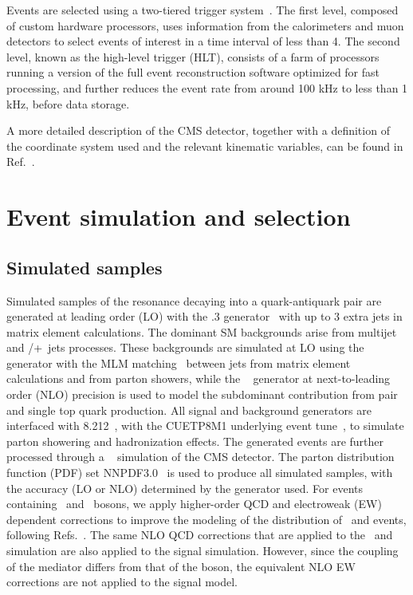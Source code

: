 \documentclass[11pt,twoside,a4paper,cmspaper,final,collab]{cms-tdr}
\begin{document}
Events are selected using a two-tiered trigger system~\cite{Khachatryan:2016bia}. 
The first level, composed
of custom hardware processors, uses information from the calorimeters and muon detectors
to select events of interest in a time interval of less than 4\mus. The
second level, known as the high-level trigger (HLT), consists of a farm of processors running a
version of the full event reconstruction software optimized for fast processing, and further reduces the
event rate from around 100 kHz to less than 1 kHz, before data storage.

A more detailed description of the CMS
detector, together with a definition of the coordinate system used and
the relevant kinematic variables, can be found
in Ref.~\cite{Chatrchyan:2008zzk}.
\label{sec:detector}

\section{Event simulation and selection}

\subsection{Simulated samples}

Simulated samples of the \PZpr resonance decaying into
a quark-antiquark pair are generated at leading order (LO) with the
.3 generator~\cite{Alwall:2014hca} with up to 3 extra jets in
matrix element calculations.  The
dominant SM backgrounds arise from multijet and \PW/\PZ+~jets processes.
These backgrounds are simulated at LO using the \MGvATNLO generator with the MLM
matching~\cite{Alwall:2007fs} between jets from matrix element calculations 
and from parton showers, while the ~\cite{POWHEG} generator 
at next-to-leading order (NLO) precision is used to
model the subdominant contribution from pair and single top quark production.  All signal and
background generators are interfaced with \PYTHIA{}
8.212~\cite{Sjostrand:2014zea}, with the CUETP8M1 underlying event tune~\cite{Khachatryan:2015pea}, to simulate 
parton showering and hadronization effects.  The generated
events are further processed through a \GEANTfour~\cite{Agostinelli:2002hh} simulation of the CMS detector.
The parton distribution function (PDF) set {NNPDF3.0}~\cite{Ball:2014uwa} is used to produce all simulated samples, 
with the accuracy (LO or NLO) determined by the generator used.
For events containing \PW~and \PZ~bosons, we apply higher-order QCD
and electroweak (EW) \pt dependent corrections to improve
the modeling of the \pt distribution of \PW~and \PZ events,
following Refs.~\cite{Sirunyan:2017hci,Kallweit:2014xda,Kallweit:2015dum,Kallweit:2015fta,Lindert:2017olm}.
The same NLO QCD corrections that are applied
to the \PW~and \PZ simulation are also applied to the signal
simulation. However, since the coupling of the \PZpr mediator differs from that of
the \PZ boson, the equivalent \PZ NLO EW corrections are not applied
to the signal model.
\end{document}

